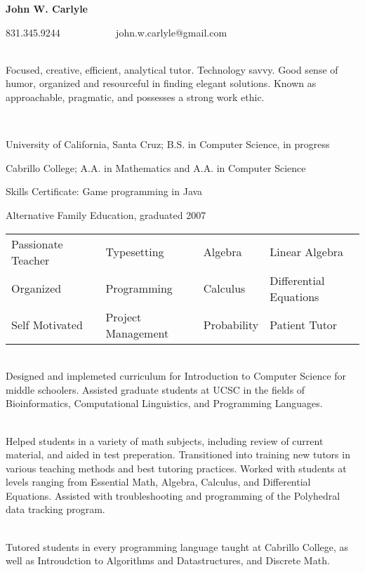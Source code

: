 \documentclass[11pt]{article} %
\begin{document}
\centerline {\LARGE \bf John W. Carlyle}
\centerline {831.345.9244 ~~~~~~~~~~ john.w.carlyle@gmail.com}
\bigskip

\smallskip
\noindent\\
Focused, creative, efficient, analytical tutor. Technology savvy. Good sense of humor, organized and resourceful in finding elegant solutions. Known as approachable, pragmatic, and possesses a strong work ethic. 
\bigskip

\bigskip
{}\\
\centerline {University of California, Santa Cruz; B.S. in Computer Science, in progress}
\centerline {Cabrillo College; A.A. in Mathematics and A.A. in Computer Science}
\centerline {Skills Certificate: Game programming in Java}
\centerline {Alternative Family Education, graduated 2007}

\bigskip
\smallskip
\begin{center}
  \begin{tabular}{llll}
    Passionate Teacher ~~& Typesetting & Algebra & Linear Algebra\\
    Organized & Programming & Calculus & Differential Equations\\
    Self Motivated & Project Management & Probability & Patient Tutor\\
  \end{tabular}
\end{center}


\bigskip
{}
\begin{adjustwidth}{0.3in}{0cm}
  \\
  Designed and implemeted curriculum for Introduction to Computer Science for middle schoolers.
  Assisted graduate students at UCSC in the fields of Bioinformatics, Computational Linguistics, and Programming Languages.

  \bigskip
  \\
  Helped students in a variety of math subjects, including review of current material, and aided in test preperation. 
  Transitioned into training new tutors in various teaching methods and best tutoring practices.
  Worked with students at levels ranging from Essential Math, Algebra, Calculus, and Differential Equations. 
  Assisted with troubleshooting and programming of the Polyhedral data tracking program.

  \bigskip
  \\
  Tutored students in every programming language taught at Cabrillo College, as well as Introudction to Algorithms and Datastructures,  and Discrete Math.
\end{adjustwidth}
\end{document}
